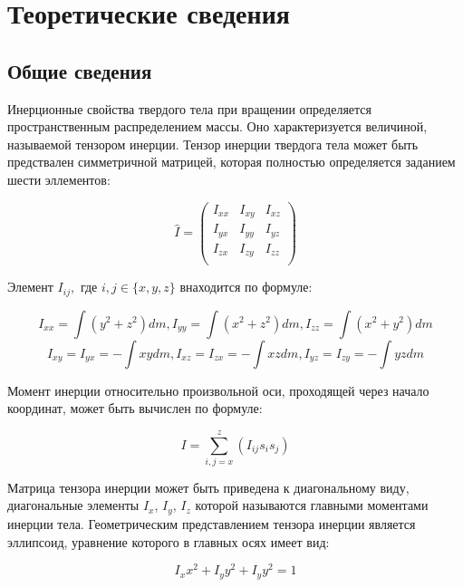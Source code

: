 \documentclass[a4paper,12pt]{article}
\begin{document}
\section{Теоретические сведения}
\subsection{Общие сведения}

Инерционные свойства твердого тела при вращении определяется
пространственным распределением массы. Оно характеризуется величиной, называемой тензором инерции. Тензор инерции твердога тела может быть предствален симметричной матрицей, которая полностью определяется заданием шести эллементов:

\begin{equation*}
\hat{I} = \left(
\begin{array}{ccc}
I_{xx} & I_{xy} & I_{xz} \\
I_{yx} & I_{yy} & I_{yz} \\
I_{zx} & I_{zy} & I_{zz} \\
\end{array}
\right)
\end{equation*}

Элемент $I_{ij}, \text{ где } i,j \in \{ x, y, z \}$ внаходится по формуле:

\begin{equation}\label{xx}
    I_{xx} = \int \left(y^2 + z^2 \right) dm, I_{yy} = \int \left(x^2 + z^2 \right) dm, I_{zz} = \int \left(x^2 + y^2 \right) dm
\end{equation}
\begin{equation}
    I_{xy} = I_{yx} = - \int xy dm, I_{xz} = I_{zx} = - \int xz dm, I_{yz} = I_{zy} = - \int yz dm
\end{equation}

Момент инерции относительно произвольной оси, проходящей через начало координат, может быть вычислен по формуле:
 
\begin{equation}
    I = \sum_{i,j=x}^{z} \left( I_{ij} s_{i} s_{j} \right)
\end{equation}

Матрица тензора инерции может быть приведена к диагональному виду, диагональные элементы $I_{x}$, $I_{y}$, $I_{z}$ которой называются главными моментами инерции тела. Геометрическим представлением тензора инерции является эллипсоид, уравнение которого в главных осях имеет вид:

\begin{equation}
    I_{x} x^2 + I_{y} y^2 + I_{y} y^2 = 1
\end{equation}
\end{document}
